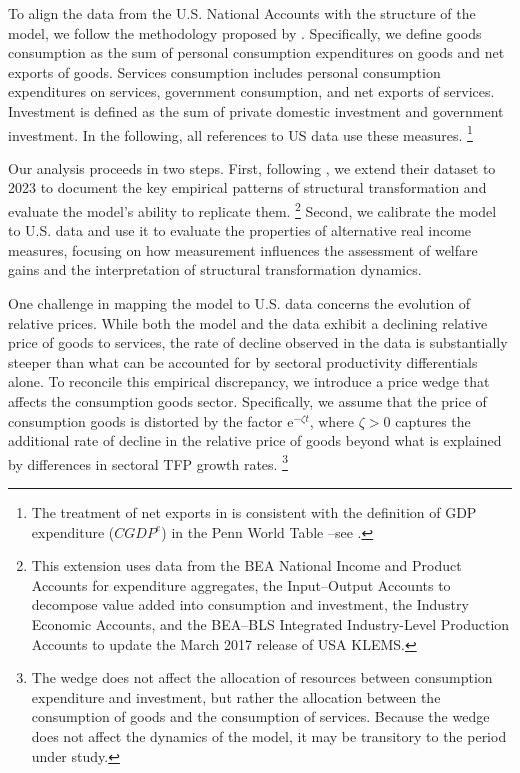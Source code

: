 \documentclass[12pt,a4paper]{article}
\begin{document}
To align the data from the U.S. National Accounts with the structure of the model, we follow the methodology proposed by \cite{herrendorf_rogerson_valentinyi_2021}.  
Specifically, we define goods consumption as the sum of personal consumption expenditures on goods and net exports of goods.  
Services consumption includes personal consumption expenditures on services, government consumption, and net exports of services.  
Investment is defined as the sum of private domestic investment and government investment.  
In the following, all references to US data use these measures.%
\footnote{The treatment of net exports in  \cite{herrendorf_rogerson_valentinyi_2021} is consistent with the definition of GDP expenditure ($CGDP^{e}$) in the Penn World Table --see \cite{feenstra2015next}.}

Our analysis proceeds in two steps.  
First, following \cite{herrendorf_rogerson_valentinyi_2021}, we extend their dataset to 2023 to document the key empirical patterns of structural transformation and evaluate the model's ability to replicate them.%
\footnote{This extension uses data from the BEA National Income and Product Accounts for expenditure aggregates, the Input--Output Accounts to decompose value added into consumption and investment, the Industry Economic Accounts, and the BEA--BLS Integrated Industry-Level Production Accounts to update the March 2017 release of USA KLEMS.}  
Second, we calibrate the model to U.S. data and use it to evaluate the properties of alternative real income measures, focusing on how measurement influences the assessment of welfare gains and the interpretation of structural transformation dynamics.

One challenge in mapping the model to U.S. data concerns the evolution of relative prices. While both the model and the data exhibit a declining relative price of goods to services, the rate of decline observed in the data is substantially steeper than what can be accounted for by sectoral productivity differentials alone. To reconcile this empirical discrepancy, we introduce a price wedge that affects the consumption goods sector. Specifically, we assume that the price of consumption goods is distorted by the factor $\text{e}^{-\zeta t}$, where $\zeta > 0$ captures the additional rate of decline in the relative price of goods beyond what is explained by differences in sectoral TFP growth rates.%
\footnote{The wedge does not affect the allocation of resources between consumption expenditure and investment, but rather the allocation between the consumption of goods and the consumption of services. Because the wedge does not affect the dynamics of the model, it may be transitory to the period under study.}
\end{document}
